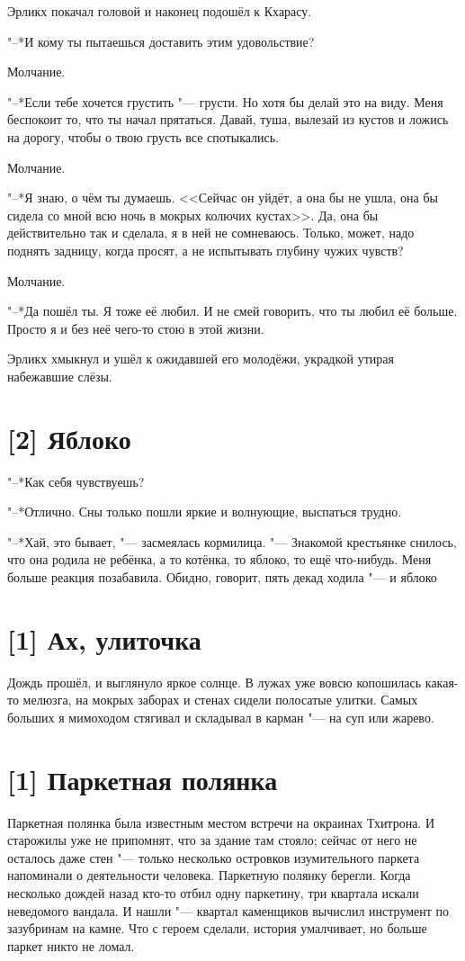 Эрликх покачал головой и наконец подошёл к Кхарасу.

"--*И кому ты пытаешься доставить этим удовольствие?

Молчание.

"--*Если тебе хочется грустить "--- грусти.
Но хотя бы делай это на виду.
Меня беспокоит то, что ты начал прятаться.
Давай, туша, вылезай из кустов и ложись на дорогу, чтобы о твою грусть все спотыкались.

Молчание.

"--*Я знаю, о чём ты думаешь.
<<Сейчас он уйдёт, а она бы не ушла, она бы сидела со мной всю ночь в мокрых колючих кустах>>.
Да, она бы действительно так и сделала, я в ней не сомневаюсь.
Только, может, надо поднять задницу, когда просят, а не испытывать глубину чужих чувств?

Молчание.

"--*Да пошёл ты.
Я тоже её любил.
И не смей говорить, что ты любил её больше.
Просто я и без неё чего-то стою в этой жизни.

Эрликх хмыкнул и ушёл к ожидавшей его молодёжи, украдкой утирая набежавшие слёзы.

\section{[2] Яблоко}

"--*Как себя чувствуешь?

"--*Отлично.
Сны только пошли яркие и волнующие, выспаться трудно.

"--*Хай, это бывает, "--- засмеялась кормилица.
"--- Знакомой крестьянке снилось, что она родила не ребёнка, а то котёнка, то яблоко, то ещё что-нибудь.
Меня больше реакция позабавила.
Обидно, говорит, пять декад ходила "--- и яблоко\ldotst

\section{[1] Ах, улиточка}

Дождь прошёл, и выглянуло яркое солнце.
В лужах уже вовсю копошилась какая-то мелюзга, на мокрых заборах и стенах сидели полосатые улитки.
Самых больших я мимоходом стягивал и складывал в карман "--- на суп или жарево.

\section{[1] Паркетная полянка}

Паркетная полянка была известным местом встречи на окраинах Тхитрона.
И старожилы уже не припомнят, что за здание там стояло;
сейчас от него не осталось даже стен "--- только несколько островков изумительного паркета напоминали о деятельности человека.
Паркетную полянку берегли.
Когда несколько дождей назад кто-то отбил одну паркетину, три квартала искали неведомого вандала.
И нашли "--- квартал каменщиков вычислил инструмент по зазубринам на камне.
Что с героем сделали, история умалчивает, но больше паркет никто не ломал.

